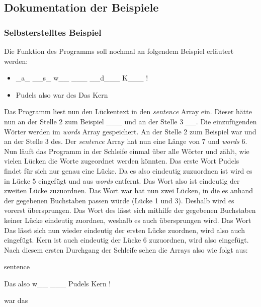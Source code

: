 \documentclass[a4paper, 12pt]{scrartcl}
\begin{document}
\subsection{Dokumentation der Beispiele}

\subsubsection{Selbsterstelltes Beispiel}
Die Funktion des Programms soll nochmal an folgendem Beispiel erläutert werden:
\begin{itemize}
    \item {\_}a{\_} {\_}{\_}s{\_} w{\_}{\_} {\_}{\_}{\_} {\_}{\_}d{\_}{\_}{\_} K{\_}{\_}{\_} !
    \item Pudels also war des Das Kern
\end{itemize}

Das Programm liest nun den Lückentext in den \emph{sentence} Array ein. Dieser hätte nun an der Stelle 2 zum Beispiel {\glqq}\_\_\_{\grqq} und an der Stelle 3 {\glqq}\_\_{\grqq}. Die einzufügenden Wörter werden im \emph{words} Array gespeichert. An der Stelle 2 zum Beispiel {\glqq}war{\grqq} und an der Stelle 3 {\glqq}des{\grqq}. Der \emph{sentence} Array hat nun eine Länge von 7 und \emph{words} 6. Nun läuft das Programm in der Schleife einmal über alle Wörter und zählt, wie vielen Lücken die Worte zugeordnet werden könnten. Das erste Wort {\glqq}Pudels{\grqq} findet für sich nur genau eine Lücke. Da es also eindeutig zuzuordnen ist wird es in Lücke 5 eingefügt und  aus  \emph{words} entfernt. Das  Wort {\glqq}also{\grqq} ist  eindeutig  der  zweiten  Lücke zuzuordnen. Das Wort {\glqq}war{\grqq} hat nun zwei Lücken, in die es anhand der gegebenen Buchstaben passen würde (Lücke 1 und 3). Deshalb wird es vorerst übersprungen. Das Wort {\glqq}des{\grqq} lässt sich mithilfe der gegebenen  Buchstaben  keiner  Lücke  eindeutig  zuordnen,  weshalb  es  auch  übersprungen  wird.  Das Wort {\glqq}Das{\grqq} lässt sich nun wieder eindeutig der ersten Lücke zuordnen, wird also auch eingefügt. {\glqq}Kern{\grqq} ist  auch  eindeutig  der  Lücke  6  zuzuordnen,  wird  also  eingefügt.  Nach  diesem  ersten  Durchgang  der Schleife sehen die Arrays also wie folgt aus:

\begin{labeling}{sentence}
    \item [sentence] Das also w{\_}{\_} {\_}{\_}{\_} Pudels Kern !
    \item [words] war das
\end{labeling}
\end{document}
